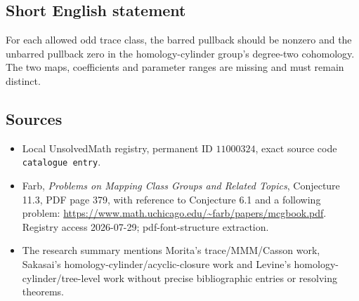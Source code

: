 \documentclass[11pt]{article}
\begin{document}
\subsection{Short English statement}
For each allowed odd trace class, the barred pullback should be nonzero and the unbarred pullback zero in the homology-cylinder group's degree-two cohomology. The two maps, coefficients and parameter ranges are missing and must remain distinct.
\subsection{Sources}
\begin{itemize}
\item Local UnsolvedMath registry, permanent ID \(11000324\), exact source code \texttt{catalogue entry}.
\item Farb, \emph{Problems on Mapping Class Groups and Related Topics}, Conjecture 11.3, PDF page 379, with reference to Conjecture 6.1 and a following problem: \url{https://www.math.uchicago.edu/~farb/papers/mcgbook.pdf}. Registry access 2026-07-29; pdf-font-structure extraction.
\item The research summary mentions Morita's trace/MMM/Casson work, Sakasai's homology-cylinder/acyclic-closure work and Levine's homology-cylinder/tree-level work without precise bibliographic entries or resolving theorems.
\end{itemize}
\end{document}
